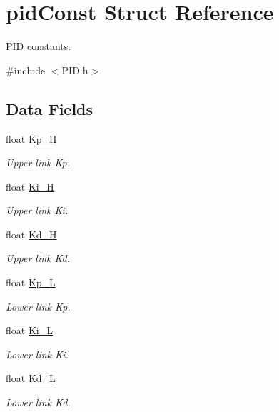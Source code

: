 \hypertarget{structpid_const}{\section{pid\-Const Struct Reference}
\label{structpid_const}
}


P\-I\-D constants.  




{\ttfamily \#include $<$P\-I\-D.\-h$>$}

\subsection*{Data Fields}
\begin{DoxyCompactItemize}
\item 
float \hyperlink{structpid_const_ae2c7d62f4fd919c89233a39e1a84b2db}{Kp\-\_\-\-H}
\begin{DoxyCompactList}\small\item\em Upper link Kp. \end{DoxyCompactList}\item 
float \hyperlink{structpid_const_a2d06f9407c1fd682baa8519e5744384a}{Ki\-\_\-\-H}
\begin{DoxyCompactList}\small\item\em Upper link Ki. \end{DoxyCompactList}\item 
float \hyperlink{structpid_const_a239f5a849b57db2f52fe4e44aa979e2f}{Kd\-\_\-\-H}
\begin{DoxyCompactList}\small\item\em Upper link Kd. \end{DoxyCompactList}\item 
float \hyperlink{structpid_const_a0e30018aca6e06a3c00d16b39f3f0133}{Kp\-\_\-\-L}
\begin{DoxyCompactList}\small\item\em Lower link Kp. \end{DoxyCompactList}\item 
float \hyperlink{structpid_const_a073fd5fd7eccdab0c8c7d5ad15bcb4c0}{Ki\-\_\-\-L}
\begin{DoxyCompactList}\small\item\em Lower link Ki. \end{DoxyCompactList}\item 
float \hyperlink{structpid_const_ab1d5ff1148dc4f1b174757fe513bc368}{Kd\-\_\-\-L}
\begin{DoxyCompactList}\small\item\em Lower link Kd. \end{DoxyCompactList}\end{DoxyCompactItemize}


